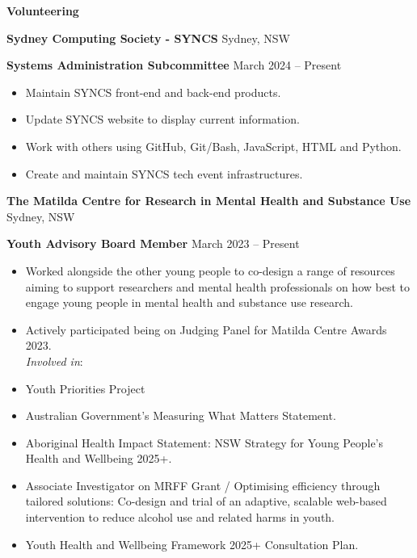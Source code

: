 \documentclass[11pt]{article}
\begin{document}

\begin{center}
    \textbf{Volunteering}\\ 
    \hrulefill
\end{center}

\textbf{Sydney Computing Society - SYNCS} \hfill Sydney, NSW

\textbf{Systems Administration Subcommittee} \hfill March 2024 – Present
\begin{itemize}[noitemsep, topsep=0pt, partopsep=0pt, parsep=0pt]
    \item Maintain SYNCS front-end and back-end products.
    \item Update SYNCS website to display current information.
    \item Work with others using GitHub, Git/Bash, JavaScript, HTML and Python.
    \item Create and maintain SYNCS tech event infrastructures.
\end{itemize}

\vspace{12pt}

\textbf{The Matilda Centre for Research in Mental Health and Substance Use} \hfill Sydney, NSW

\textbf{Youth Advisory Board Member} \hfill March 2023 – Present
\begin{itemize}[noitemsep, topsep=0pt, partopsep=0pt, parsep=0pt]
    \item Worked alongside the other young people to co-design a range of resources aiming to support researchers and mental health professionals on how best to engage young people in mental health and substance use research.
    \item Actively participated being on Judging Panel for Matilda Centre Awards 2023.\\
    \textit{Involved in}:
    \item Youth Priorities Project
    \item Australian Government's Measuring What Matters Statement.
    \item Aboriginal Health Impact Statement: NSW Strategy for Young People's Health and Wellbeing 2025+.
    \item Associate Investigator on MRFF Grant / Optimising efficiency through tailored solutions: Co-design and trial of an adaptive, scalable web-based intervention to reduce alcohol use and related harms in youth.
    \item Youth Health and Wellbeing Framework 2025+ Consultation Plan.
\end{itemize}
\end{document}
